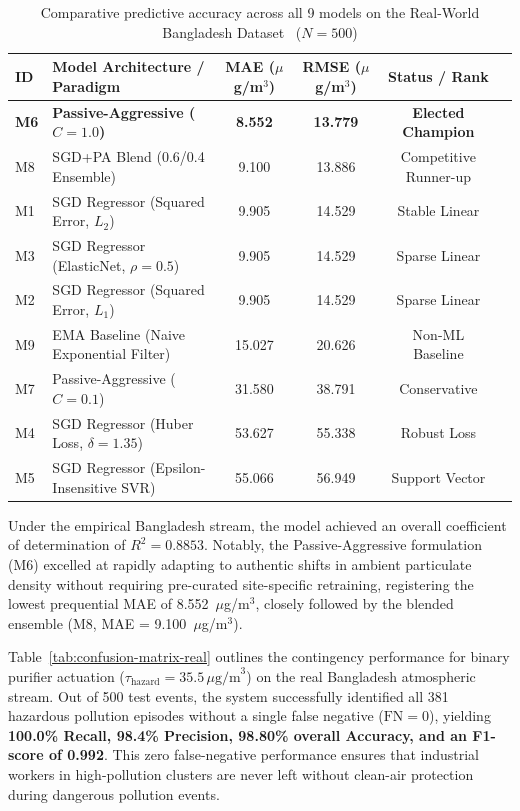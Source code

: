\begin{table}[htbp]
\centering
\caption{Comparative predictive accuracy across all 9 models on the Real-World Bangladesh Dataset~\cite{paul2026bangladesh} ($N=500$)}
\label{tab:exp-real-comparison}
\small
\setlength{\tabcolsep}{4.5pt}
\begin{tabular}{@{}llcccl@{}}
\toprule
\textbf{ID} & \textbf{Model Architecture / Paradigm} & \textbf{MAE ($\mu$g/m$^3$)} & \textbf{RMSE ($\mu$g/m$^3$)} & \textbf{Status / Rank} \\
\midrule
\textbf{M6} & \textbf{Passive-Aggressive ($C=1.0$)} & \textbf{8.552} & \textbf{13.779} & \textbf{Elected Champion} \\
M8 & SGD+PA Blend (0.6/0.4 Ensemble) & 9.100 & 13.886 & Competitive Runner-up \\
M1 & SGD Regressor (Squared Error, $L_2$) & 9.905 & 14.529 & Stable Linear \\
M3 & SGD Regressor (ElasticNet, $\rho=0.5$) & 9.905 & 14.529 & Sparse Linear \\
M2 & SGD Regressor (Squared Error, $L_1$) & 9.905 & 14.529 & Sparse Linear \\
M9 & EMA Baseline (Naive Exponential Filter) & 15.027 & 20.626 & Non-ML Baseline \\
M7 & Passive-Aggressive ($C=0.1$) & 31.580 & 38.791 & Conservative \\
M4 & SGD Regressor (Huber Loss, $\delta=1.35$) & 53.627 & 55.338 & Robust Loss \\
M5 & SGD Regressor (Epsilon-Insensitive SVR) & 55.066 & 56.949 & Support Vector \\
\bottomrule
\end{tabular}
\end{table}

Under the empirical Bangladesh stream, the model achieved an overall coefficient of determination of $R^2 = 0.8853$. Notably, the Passive-Aggressive formulation (M6) excelled at rapidly adapting to authentic shifts in ambient particulate density without requiring pre-curated site-specific retraining, registering the lowest prequential MAE of 8.552~$\mu$g/m$^3$, closely followed by the blended ensemble (M8, MAE = 9.100~$\mu$g/m$^3$).

Table~\ref{tab:confusion-matrix-real} outlines the contingency performance for binary purifier actuation ($\tau_{\text{hazard}} = 35.5\,\mu\text{g/m}^3$) on the real Bangladesh atmospheric stream. Out of 500 test events, the system successfully identified all 381 hazardous pollution episodes without a single false negative ($\text{FN} = 0$), yielding \textbf{100.0\% Recall, 98.4\% Precision, 98.80\% overall Accuracy, and an F1-score of 0.992}. This zero false-negative performance ensures that industrial workers in high-pollution clusters are never left without clean-air protection during dangerous pollution events.

